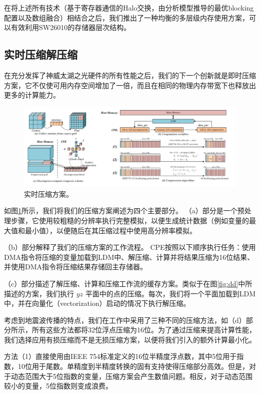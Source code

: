 \documentclass[degree=doctor]{thuthesis}
\begin{document}
在将上述所有技术（基于寄存器通信的Halo交换，由分析模型推导的最优blocking配置以及数组融合）相结合之后，我们推出了一种均衡的多层级内存使用方案，可以有效利用SW26010的存储器层次结构。

\subsection{实时压缩解压缩}

在充分发挥了神威太湖之光硬件的所有性能之后，我们的下一个创新就是即时压缩方案，它不仅使可用内存空间增加了一倍，而且在相同的物理内存带宽下也释放出更多的计算能力。

\begin{figure}[h]
\centering

\includegraphics[width=1.0\textwidth]{compression.pdf}
\caption{实时压缩方案。}
\label{fig:compression}
\end{figure}

如图\ref{fig:compression}所示，我们将我们的压缩方案阐述为四个主要部分。 （a）部分是一个预处理步骤，它使用较粗糙的分辨率执行完整模拟，以便生成统计数据（例如变量的最大值和最小值），以便随后在其压缩过程中使用高分辨率模拟。

（b）部分解释了我们的压缩方案的工作流程。 CPE按照以下顺序执行任务：使用DMA指令将压缩的变量加载到LDM中、解压缩、计算并将结果压缩为16位结果、并使用DMA指令将压缩结果存储回主存储器。

（c）部分描述了解压缩、计算和压缩工作流的缓存方案。类似于在图\ref{fig:dd}中所描述的方案，我们执行 $ yz $ 平面中的点的压缩。每次，我们将一个平面加载到LDM中，并在向量化（vectorization）启动的情况下执行解压缩。

考虑到地震波传播的特点，我们在工作中采用了三种不同的压缩方法，如（d）部分所示，所有这些方法都将32位浮点压缩为16位。为了通过压缩来提高计算性能，我们选择应用有损压缩而不是无损压缩方案，以便将我们引入的额外计算最小化。

方法（1）直接使用由IEEE 754标准定义的16位半精度浮点数，其中5位用于指数，10位用于尾数。单精度到半精度转换的固有支持使得压缩部分高效。但是，对于动态范围大于5位指数的变量，压缩方案会产生数值问题。相反，对于动态范围较小的变量，5位指数则变成浪费。
\end{document}
